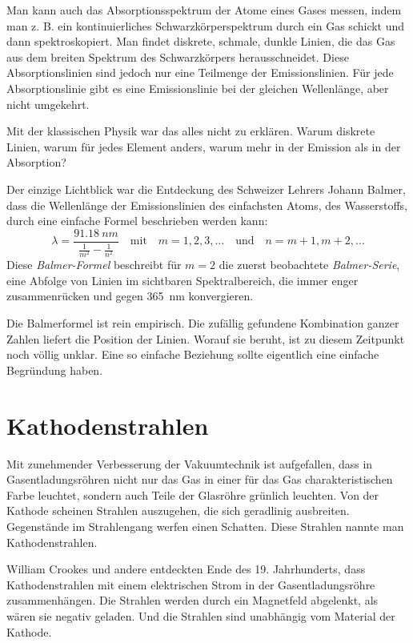 Man kann auch das Absorptionsspektrum der Atome eines Gases messen, indem man z. B. ein kontinuierliches Schwarzkörperspektrum durch ein Gas schickt und dann spektroskopiert. Man findet diskrete, schmale, dunkle Linien, die das Gas aus dem breiten Spektrum des Schwarzkörpers herausschneidet. Diese Absorptionslinien sind jedoch nur eine Teilmenge der Emissionslinien. Für jede Absorptionslinie gibt es eine Emissionslinie bei der gleichen Wellenlänge, aber nicht umgekehrt.

Mit der klassischen Physik war das alles nicht zu erklären. Warum diskrete Linien, warum für jedes Element anders, warum mehr in der Emission als in der Absorption?

Der einzige Lichtblick war die Entdeckung des Schweizer Lehrers Johann Balmer, dass die Wellenlänge der Emissionslinien des einfachsten Atoms, des Wasserstoffs, durch eine einfache Formel beschrieben werden kann:
\begin{equation}
    \lambda = \frac{\SI{91.18}{nm}}{ 
       \frac{1}{m^2} - \frac{1}{n^2} 
    }
    \quad \text{mit} \quad m = 1,2, 3, \dots \quad \text{und} \quad n = m+1, m+2, \dots
\end{equation}
Diese \emph{Balmer-Formel} beschreibt für $m=2$ die zuerst beobachtete \emph{Balmer-Serie}, eine Abfolge von Linien im sichtbaren Spektralbereich, die immer enger zusammenrücken und gegen 365~nm konvergieren.  

Die Balmerformel ist rein empirisch. Die zufällig gefundene Kombination ganzer Zahlen liefert die Position der Linien. Worauf sie beruht, ist zu diesem Zeitpunkt noch völlig unklar. Eine so einfache Beziehung sollte eigentlich eine einfache Begründung haben.


\section{Kathodenstrahlen}

Mit zunehmender Verbesserung der Vakuumtechnik ist aufgefallen, dass in Gasentladungsröhren nicht nur das Gas in einer für das Gas charakteristischen Farbe leuchtet, sondern auch Teile der Glasröhre grünlich leuchten.  Von der Kathode scheinen Strahlen auszugehen, die sich geradlinig ausbreiten. Gegenstände im Strahlengang werfen einen Schatten. Diese Strahlen nannte man Kathodenstrahlen.

William Crookes und andere entdeckten Ende des 19. Jahrhunderts, dass Kathodenstrahlen mit einem elektrischen Strom in der Gasentladungsröhre zusammenhängen. Die Strahlen werden durch ein Magnetfeld abgelenkt, als wären sie negativ geladen. Und die Strahlen sind unabhängig vom Material der Kathode.


